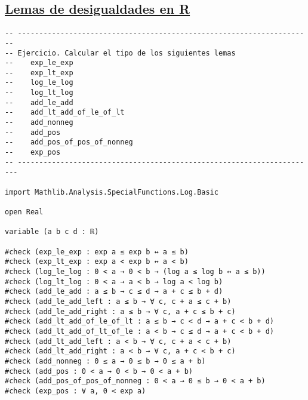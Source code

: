\subsection{\href{./src/Basicos/Lemas\_de\_desigualdades\_en\_R.lean}{Lemas de desigualdades en R}}
\label{sec:orgec591cd}
\begin{verbatim}
-- ---------------------------------------------------------------------
-- Ejercicio. Calcular el tipo de los siguientes lemas
--    exp_le_exp
--    exp_lt_exp
--    log_le_log
--    log_lt_log
--    add_le_add
--    add_lt_add_of_le_of_lt
--    add_nonneg
--    add_pos
--    add_pos_of_pos_of_nonneg
--    exp_pos
-- ----------------------------------------------------------------------

import Mathlib.Analysis.SpecialFunctions.Log.Basic

open Real

variable (a b c d : ℝ)

#check (exp_le_exp : exp a ≤ exp b ↔ a ≤ b)
#check (exp_lt_exp : exp a < exp b ↔ a < b)
#check (log_le_log : 0 < a → 0 < b → (log a ≤ log b ↔ a ≤ b))
#check (log_lt_log : 0 < a → a < b → log a < log b)
#check (add_le_add : a ≤ b → c ≤ d → a + c ≤ b + d)
#check (add_le_add_left : a ≤ b → ∀ c, c + a ≤ c + b)
#check (add_le_add_right : a ≤ b → ∀ c, a + c ≤ b + c)
#check (add_lt_add_of_le_of_lt : a ≤ b → c < d → a + c < b + d)
#check (add_lt_add_of_lt_of_le : a < b → c ≤ d → a + c < b + d)
#check (add_lt_add_left : a < b → ∀ c, c + a < c + b)
#check (add_lt_add_right : a < b → ∀ c, a + c < b + c)
#check (add_nonneg : 0 ≤ a → 0 ≤ b → 0 ≤ a + b)
#check (add_pos : 0 < a → 0 < b → 0 < a + b)
#check (add_pos_of_pos_of_nonneg : 0 < a → 0 ≤ b → 0 < a + b)
#check (exp_pos : ∀ a, 0 < exp a)
\end{verbatim}

